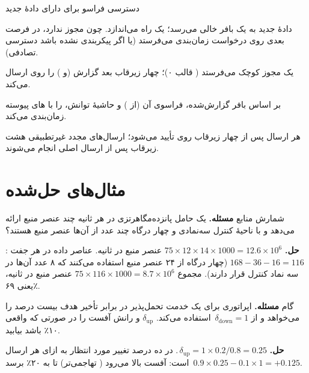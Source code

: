 \documentclass[11pt,a4paper]{article}
\begin{document}
\begin{procedurebox}{دسترسی فراسو برای  دارای دادهٔ جدید}\label{proc:ul}
\begin{steps}
  \item دادهٔ جدید به یک بافر خالی می‌رسد؛  یک  راه می‌اندازد. چون مجوز ندارد، در فرصت 
        بعدی روی  درخواست زمان‌بندی می‌فرستد (یا اگر پیکربندی نشده باشد دسترسی تصادفی).
  \item {} یک مجوز کوچک می‌فرستد ( قالب ۰)؛ چهار زیرقاب بعد  گزارش  (و )
        را روی  ارسال می‌کند.
  \item {} بر اساس بافر گزارش‌شده،  فراسوی آن (از ) و حاشیهٔ توانش،  را با
        های پیوسته زمان‌بندی می‌کند.
  \item هر ارسال  پس از چهار زیرقاب روی  تأیید می‌شود؛ ارسال‌های مجدد غیرتطبیقی هشت زیرقاب
        پس از ارسال اصلی انجام می‌شوند.
\end{steps}
\end{procedurebox}

\section{مثال‌های حل‌شده}

\begin{examplebox}{شمارش منابع}\label{ex:count}
\textbf{مسئله.} یک حامل  پانزده‌مگاهرتزی در هر ثانیه چند عنصر منبع ارائه می‌دهد و با ناحیهٔ کنترل سه‌نمادی
و چهار درگاه  چند عدد از آن‌ها عنصر منبع  هستند؟

\textbf{حل.} $75\times12\times14\times1000 = 12.6\times10^6$ عنصر منبع در ثانیه. عناصر داده در هر جفت :
$168 - 36 - 16 = 116$ (چهار درگاه  از ۲۴ عنصر منبع استفاده می‌کنند که ۸ عدد آن‌ها در سه نماد کنترل
قرار دارند). مجموع $75\times116\times1000 = 8.7\times10^6$ عنصر منبع در ثانیه، یعنی ۶۹٪.
\end{examplebox}

\begin{examplebox}{گام }\label{ex:olla}
\textbf{مسئله.} اپراتوری برای یک خدمت تحمل‌پذیر در برابر تأخیر هدف  بیست درصد را می‌خواهد و از
$\delta_{\mathrm{down}} = 1$\, استفاده می‌کند. $\delta_{\mathrm{up}}$ و رانش آفست را در صورتی که  واقعی
۱۰٪ باشد بیابید.

\textbf{حل.} $\delta_{\mathrm{up}} = 1\times0.2/0.8 = 0.25$\,. در  ده درصد تغییر مورد انتظار به ازای هر
ارسال $0.9\times0.25 - 0.1\times1 = +0.125$\, است: آفست بالا می‌رود ( تهاجمی‌تر) تا  به ۲۰٪ برسد.
\end{examplebox}
\end{document}
